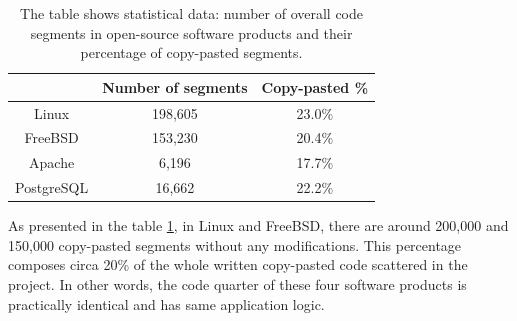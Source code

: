 \documentclass{report}
\begin{document}
\begin{table}[h]
\centering
\begin{tabular}{|c|c|c|}
\hline
\rowcolor[HTML]{C0C0C0} 
\multicolumn{1}{|l|}{\cellcolor[HTML]{C0C0C0}\textbf{Project}} & \multicolumn{1}{l|}{\cellcolor[HTML]{C0C0C0}\textbf{Number of segments}} & \multicolumn{1}{l|}{\cellcolor[HTML]{C0C0C0}\textbf{Copy-pasted \%}} \\ \hline
Linux                                                          & 198,605                                                                   & 23.0\%                                                               \\ \hline
FreeBSD                                                        & 153,230                                                                   & 20.4\%                                                               \\ \hline
Apache                                                         & 6,196                                                                     & 17.7\%                                                               \\ \hline
PostgreSQL                                                     & 16,662                                                                     & 22.2\%                                                               \\ \hline
\end{tabular}
\caption[Statistical data of clones detected in open-source products]{The table shows statistical data: number of overall code segments in open-source software products and their percentage of copy-pasted segments.}
\label{table:products-compare}
\end{table}
As presented in the table \ref{table:products-compare}, in Linux and FreeBSD, there are around 200,000 and 150,000 copy-pasted segments without any modifications. This percentage composes circa 20\% of the whole written copy-pasted code scattered in the project. In other words, the code quarter of these four software products is practically identical and has same application logic.

\newpage	
\end{document}
